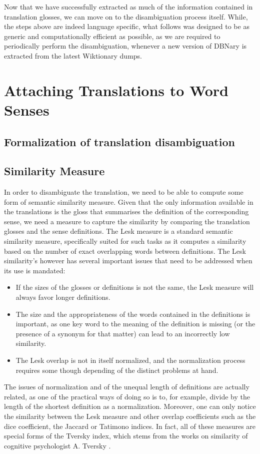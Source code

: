 \documentclass[10pt, a4paper]{article}
\begin{document}
Now that we have successfully extracted as much of the information contained in translation glosses, we can move on to the disambiguation process itself. While, the steps above are indeed language specific, what follows was designed to be as generic and computationally efficient as possible, as we are required to periodically perform the disambiguation, whenever a new version of DBNary is extracted from the latest Wiktionary dumps.

\section{Attaching Translations to Word Senses}
\subsection{Formalization of translation disambiguation}
\subsection{Similarity Measure}
In order to disambiguate the translation, we need to be able to compute some form of semantic similarity measure. Given that the only information available in the translations is the gloss that summarises the definition of the corresponding sense, we need a measure to capture the similarity by comparing the translation glosses and the sense definitions. The Lesk \cite{citeulike:625530} measure is a standard semantic similarity measure, specifically suited for such tasks as it computes a similarity based on the number of exact overlapping words between definitions. The Lesk similarity's however has several important issues that need to be addressed when its use is mandated: 
\begin{itemize}
	\item If the sizes of the glosses or definitions is not the same, the Lesk measure will always favor longer definitions.
	\item The size and the appropriateness of the words contained in the definitions is important, as one key word to the meaning of the definition is missing (or the presence of a synonym for that matter) can lead to an incorrectly low similarity.
	\item The Lesk overlap is not in itself normalized, and the normalization process requires some though depending of the distinct problems at hand.
\end{itemize}
 
 The issues of normalization and of the unequal length of definitions are actually related, as one of the practical ways of doing so is to, for example, divide by the length of the shortest definition as a normalization. Moreover, one can only notice the similarity between the Lesk measure and other overlap coefficients such as the dice coefficient, the Jaccard or Tatimono indices. In fact, all of these measures are special forms of the Tversky index, which stems from the works on similarity of cognitive psychologist A. Tversky \cite{tversky77similarity}.
\end{document}
